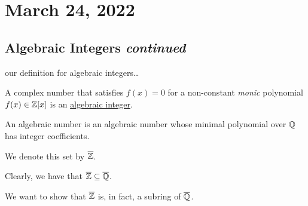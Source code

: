 \section{March 24, 2022}
\subsection{Algebraic Integers \emph{continued}}
\recall our definition for algebraic integers\dots
\begin{definition*}
    A complex number that satisfies $f(x) = 0$ for a non-constant \emph{monic} polynomial $f(x)\in\mathbb Z[x]$ is an \ul{algebraic integer}.

    An algebraic number is an algebraic number whose minimal polynomial over $\mathbb Q$ has integer coefficients.

    We denote this set by $\overline{\mathbb Z}$.
\end{definition*}

Clearly, we have that $\overline{\mathbb Z} \subseteq \overline{\mathbb Q}$.
\begin{claim*}
    We want to show that $\overline{\mathbb Z}$ is, in fact, a subring of $\overline{\mathbb Q}$.
\end{claim*}

